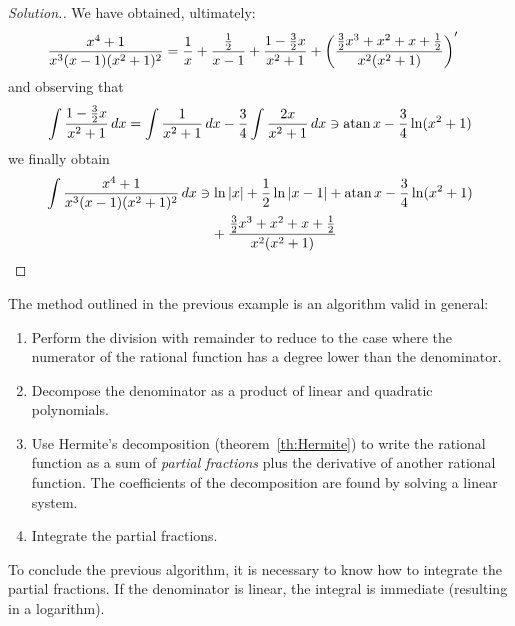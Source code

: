 \begin{proof}[Solution.]
We have obtained, ultimately:
\begin{align*}
\frac{x^4+1}{x^3(x-1)(x^2+1)^2}
&= \frac{1}{x} + \frac{\frac 1 2}{x-1} + \frac{1 - \frac 3 2 x}{x^2+1}
+ {\left( \frac{\frac 3 2 x^3 + x^2 + x + \frac 1 2}{x^2(x^2+1)} \right)}'
\end{align*}
and observing that
\[
 \int \frac{1 - \frac 3 2 x}{x^2+1}\, dx
 = \int \frac{1}{x^2+1}\, dx - \frac 3 4 \int \frac{2x}{x^2+1}\, dx
 \ni \operatorname{atan} x - \frac 3 4 \ln(x^2+1)
\]
we finally obtain
\begin{align*}
\int \frac{x^4+1}{x^3(x-1)(x^2+1)^2}\, dx
 &\ni \ln {\left|x\right|} + \frac 1 2 \ln{\left|x-1\right|} + \operatorname{atan} x - \frac 3 4 \ln(x^2+1) \\
 &\quad + \frac{\frac 3 2 x^3 + x^2+x+\frac 1 2}{x^2(x^2+1)}
\end{align*}
\end{proof}

The method outlined in the previous example is an algorithm 
valid in general:
%
%
%
%
%
\begin{enumerate}
  \item Perform the division with remainder to reduce
  to the case where the numerator of the rational function
  has a degree lower than the denominator.
  \item Decompose the denominator as a product of
  linear and quadratic polynomials.
  \item Use Hermite's decomposition (theorem~\ref{th:Hermite})
  to write the rational function as a sum of \emph{partial fractions}
  plus the derivative of another rational function. The coefficients
  of the decomposition are found by solving a linear system.
  \item Integrate the partial fractions.
\end{enumerate}

To conclude the previous algorithm, it is necessary to know how to integrate the
partial fractions. If the denominator is linear, the integral is immediate
(resulting in a logarithm).

